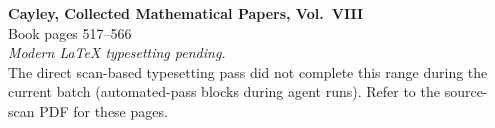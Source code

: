 \documentclass[11pt,a4paper]{article}
\begin{document}
\vspace*{2in}
\begin{center}
{\large\bfseries Cayley, Collected Mathematical Papers, Vol.~VIII}\\[1em]
{\large Book pages 517--566}\\[2em]
\textit{Modern LaTeX typesetting pending.}\\[1em]
The direct scan-based typesetting pass did not complete this range
during the current batch (automated-pass blocks during agent runs).
Refer to the source-scan PDF for these pages.
\end{center}
\end{document}
